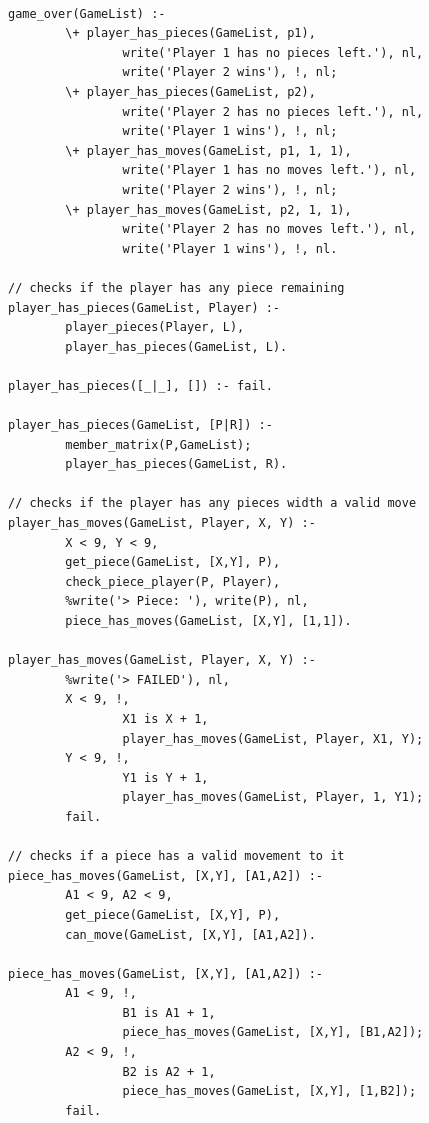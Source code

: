 \begin{lstlisting}

game_over(GameList) :-
        \+ player_has_pieces(GameList, p1),
                write('Player 1 has no pieces left.'), nl,
                write('Player 2 wins'), !, nl;
        \+ player_has_pieces(GameList, p2),
                write('Player 2 has no pieces left.'), nl,
                write('Player 1 wins'), !, nl;
        \+ player_has_moves(GameList, p1, 1, 1),
                write('Player 1 has no moves left.'), nl,
                write('Player 2 wins'), !, nl;
        \+ player_has_moves(GameList, p2, 1, 1),
                write('Player 2 has no moves left.'), nl,
                write('Player 1 wins'), !, nl.

// checks if the player has any piece remaining
player_has_pieces(GameList, Player) :-
        player_pieces(Player, L),
        player_has_pieces(GameList, L).

player_has_pieces([_|_], []) :- fail.

player_has_pieces(GameList, [P|R]) :-
        member_matrix(P,GameList);
        player_has_pieces(GameList, R).

// checks if the player has any pieces width a valid move
player_has_moves(GameList, Player, X, Y) :-
        X < 9, Y < 9,
        get_piece(GameList, [X,Y], P),
        check_piece_player(P, Player),
        %write('> Piece: '), write(P), nl,
        piece_has_moves(GameList, [X,Y], [1,1]).

player_has_moves(GameList, Player, X, Y) :-
        %write('> FAILED'), nl,
        X < 9, !,
                X1 is X + 1,
                player_has_moves(GameList, Player, X1, Y);
        Y < 9, !,
                Y1 is Y + 1,
                player_has_moves(GameList, Player, 1, Y1);
        fail.

// checks if a piece has a valid movement to it
piece_has_moves(GameList, [X,Y], [A1,A2]) :-
        A1 < 9, A2 < 9,
        get_piece(GameList, [X,Y], P),
        can_move(GameList, [X,Y], [A1,A2]).

piece_has_moves(GameList, [X,Y], [A1,A2]) :-
        A1 < 9, !,
                B1 is A1 + 1,
                piece_has_moves(GameList, [X,Y], [B1,A2]);
        A2 < 9, !,
                B2 is A2 + 1,
                piece_has_moves(GameList, [X,Y], [1,B2]);
        fail.

\end{lstlisting}



